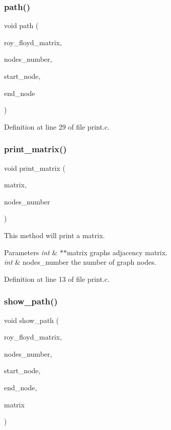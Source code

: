 \subsubsection{path()}
{\footnotesize\ttfamily void path (\begin{DoxyParamCaption}\item[{int $\ast$$\ast$}]{roy\+\_\+floyd\+\_\+matrix,  }\item[{int}]{nodes\+\_\+number,  }\item[{int}]{start\+\_\+node,  }\item[{int}]{end\+\_\+node }\end{DoxyParamCaption})}



Definition at line 29 of file print.\+c.

\mbox{\label{print_8h_a921b41cb0b745c5a64f4987a06648ac2}} 
\subsubsection{print\+\_\+matrix()}
{\footnotesize\ttfamily void print\+\_\+matrix (\begin{DoxyParamCaption}\item[{int $\ast$$\ast$}]{matrix,  }\item[{int}]{nodes\+\_\+number }\end{DoxyParamCaption})}

This method will print a matrix. 
\begin{DoxyParams}{Parameters}
{\em int} & $\ast$$\ast$matrix graph\textquotesingle{}s adjacency matrix. \\
\hline
{\em int} & nodes\+\_\+number the number of graph nodes. \\
\hline
\end{DoxyParams}


Definition at line 13 of file print.\+c.

\mbox{\label{print_8h_af84e0f341bf4d40304ae5a08dcaa1029}} 
\subsubsection{show\+\_\+path()}
{\footnotesize\ttfamily void show\+\_\+path (\begin{DoxyParamCaption}\item[{int $\ast$$\ast$}]{roy\+\_\+floyd\+\_\+matrix,  }\item[{int}]{nodes\+\_\+number,  }\item[{int}]{start\+\_\+node,  }\item[{int}]{end\+\_\+node,  }\item[{int $\ast$$\ast$}]{matrix }\end{DoxyParamCaption})}

